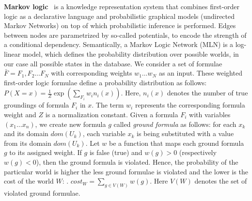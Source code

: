 
\textbf{Markov logic}~\cite{domingos2009markov} is a knowledge representation system that combines first-order logic as a declarative language and probabilistic graphical models (undirected Markov Networks) on top of which probabilistic inference is performed.  Edges between nodes are parametrized by so-called potentials, to encode the strength of a conditional dependency.   
Semantically, a Markov Logic Network (MLN) is a log-linear model, which defines the probability 
distribution over possible worlds, in our case all possible states in the database.%
We consider a set of formulae $\bar{F} = F_1, F_2 \dots F_N$ with corresponding weights $w_1 \dots w_N$ as an input.  These weighted first-order logic formulae define a probability distribution as follows: $P \left( X = x \right) = \frac{1}{Z} \exp\left( \sum_{F_i} w_i n_i \left( x \right) \right)$. Here, $n_i(x)$ denotes the number of true groundings of formula $F_i$ in $x$. The term $w_i$ represents the corresponding formula weight and $Z$ is a normalization constant. 
Given a formula $F_i$ with variables $(x_1 \dots x_n)$, we create new formula $g$ called \textit{ground formula}  as follows: for each $x_k$ and its domain $dom(U_k)$, each variable $x_k$ is being substituted with a value from its domain $dom(U_k)$.
Let $w$ be a function that maps each ground formula $g$ to its assigned weight. If $g$ is false (true) and $w(g)>0$ (respectively $w(g)<0$), then the ground formula is violated. Hence, the probability of the particular world is higher the less ground formulae is violated and the lower is the cost of the world $W$: . $cost_W = \sum_{g \in V(W)} w(g)$. Here $V(W)$ denotes the set of violated ground formulae.

